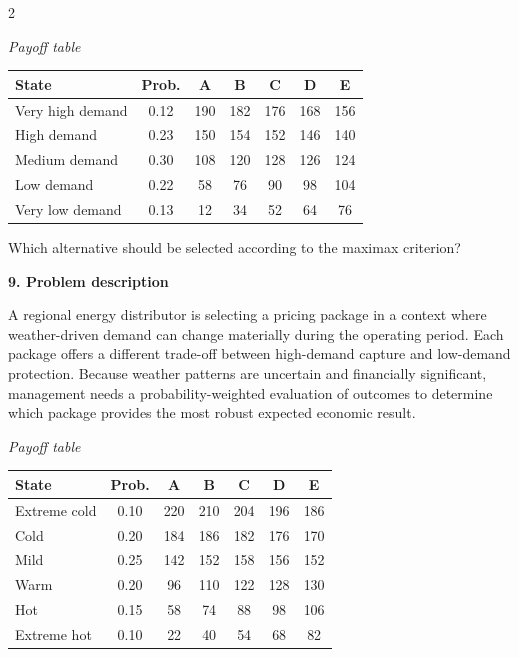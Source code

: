 \documentclass[12pt]{article}
\newcommand{\SubsectionBox}[1]{%
	\noindent\colorbox{gray!30}{%
		\parbox{\linewidth}{\textbf{#1}}%
	}\par\vspace{0.35cm}%
}
\begin{document}
\begin{multicols}{2}
				\begin{center}
					\textit{Payoff table} \par
					\begin{tabular}{l c c c c c c}
						\toprule
						State & Prob. & A & B & C & D & E \\
						\midrule
						Very high demand & 0.12 & 190 & 182 & 176 & 168 & 156 \\
						High demand & 0.23 & 150 & 154 & 152 & 146 & 140 \\
						Medium demand & 0.30 & 108 & 120 & 128 & 126 & 124 \\
						Low demand & 0.22 & 58 & 76 & 90 & 98 & 104 \\
						Very low demand & 0.13 & 12 & 34 & 52 & 64 & 76 \\
						\bottomrule
					\end{tabular}
				\end{center}
		
				Which alternative should be selected according to the maximax criterion?

		\vspace{0.25cm}
		\SubsectionBox{9. Problem description}\vspace{-0.25cm}
		A regional energy distributor is selecting a pricing package in a context where weather-driven demand can change materially during the operating period. Each package offers a different trade-off between high-demand capture and low-demand protection. Because weather patterns are uncertain and financially significant, management needs a probability-weighted evaluation of outcomes to determine which package provides the most robust expected economic result.
		
				\begin{center}
					\textit{Payoff table}
					\begin{tabular}{l c c c c c c}
						\toprule
						State & Prob. & A & B & C & D & E \\
						\midrule
						Extreme cold & 0.10 & 220 & 210 & 204 & 196 & 186 \\
						Cold & 0.20 & 184 & 186 & 182 & 176 & 170 \\
						Mild & 0.25 & 142 & 152 & 158 & 156 & 152 \\
						Warm & 0.20 & 96 & 110 & 122 & 128 & 130 \\
						Hot & 0.15 & 58 & 74 & 88 & 98 & 106 \\
						Extreme hot & 0.10 & 22 & 40 & 54 & 68 & 82 \\
						\bottomrule
					\end{tabular}
				\end{center}
		

\end{multicols}
\end{document}
